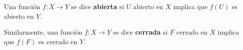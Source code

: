 

\begin{definition}
Una función $f : X \longrightarrow Y$ se dice \textbf{abierta} si $U$ abierto en $X$ implica que $f(U)$ es abierto en $Y$.
\end{definition}

\begin{definition}
Similarmente, una función $f : X \longrightarrow Y$ se dice \textbf{cerrada} si $F$ cerrado en $X$ implica que $f(F)$ es cerrado en $Y$.
\end{definition}
